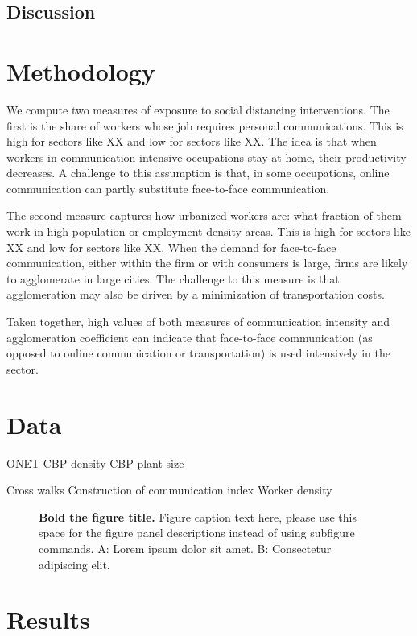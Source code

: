 \documentclass[10pt,letterpaper]{article}
\begin{document}
\subsection{Discussion}

\section{Methodology}
We compute two measures of exposure to social distancing interventions. The first is the share of workers whose job requires personal communications. This is high for sectors like XX and low for sectors like XX. The idea is that when workers in communication-intensive occupations stay at home, their productivity decreases. A challenge to this assumption is that, in some occupations, online communication can partly substitute face-to-face communication.

The second measure captures how urbanized workers are: what fraction of them work in high population or employment density areas. This is high for sectors like XX and low for sectors like XX. When the demand for face-to-face communication, either within the firm or with consumers is large, firms are likely to agglomerate in large cities. The challenge to this measure is that agglomeration may also be driven by a minimization of transportation costs.

Taken together, high values of both measures of communication intensity and agglomeration coefficient can indicate that face-to-face communication (as opposed to online communication or transportation) is used intensively in the sector.

\section{Data}
ONET
CBP density
CBP plant size

Cross walks
Construction of communication index
Worker density
\begin{figure}[!h]
\caption{{\bf Bold the figure title.}
Figure caption text here, please use this space for the figure panel descriptions instead of using subfigure commands. A: Lorem ipsum dolor sit amet. B: Consectetur adipiscing elit.}
\label{fig1}
\end{figure}

\section*{Results}
\end{document}
